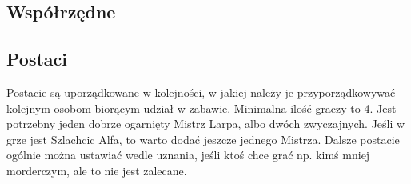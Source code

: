 	\subsection{Współrzędne}
	\label{sec:wspolrzedne}
		\begin{multicols}{3}
		\end{multicols}

	\newpage
	\thispagestyle{empty}
	\subsection{Postaci}
	\label{sec:characters}
		Postacie są uporządkowane w kolejności, w jakiej należy je przyporządkowywać kolejnym osobom biorącym udział w zabawie.
		Minimalna ilość graczy to 4. Jest potrzebny jeden dobrze ogarnięty Mistrz Larpa, albo dwóch zwyczajnych.
		Jeśli w grze jest Szlachcic Alfa, to warto dodać jeszcze jednego Mistrza.
		Dalsze postacie ogólnie można ustawiać wedle uznania, jeśli ktoś chce grać np. kimś mniej morderczym, ale to nie jest zalecane.
		
